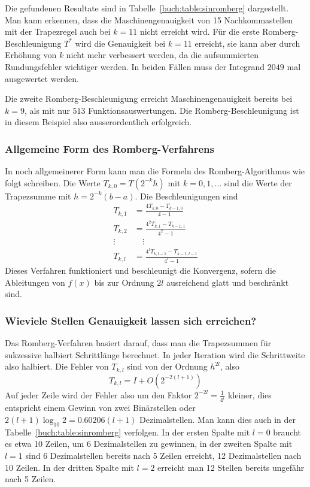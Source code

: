Die gefundenen Resultate sind in Tabelle~\ref{buch:table:sinromberg}
dargestellt.
Man kann erkennen, dass die Maschinengenauigkeit von 15 Nachkommastellen
mit der Trapezregel auch bei $k=11$  nicht erreicht wird.
Für die erste Romberg-Beschleunigung $T^*$ wird die Genauigkeit
bei $k=11$ erreicht, sie kann aber durch Erhöhung von $k$ nicht
mehr verbessert werden, da die aufsummierten Rundungsfehler
wichtiger werden.
In beiden Fällen muss der Integrand $2049$ mal ausgewertet werden.

Die zweite Romberg-Beschleunigung erreicht Maschinengenauigkeit bereits bei
$k=9$, als mit nur $513$ Funktionsauswertungen.
Die Romberg-Beschleunigung ist in diesem Beispiel also ausserordentlich
erfolgreich.

\subsubsection{Allgemeine Form des Romberg-Verfahrens}
In noch allgemeinerer Form kann man die Formeln des Romberg-Algorithmus
wie folgt schreiben.
Die Werte 
$T_{k,0} = T(2^{-k}h)$ mit $k=0,1,\dots$
sind die Werte der Trapezsumme mit $h=2^{-k}(b-a)$.
Die Beschleunigungen sind
\begin{align*}
T_{k,1} &= \frac{4T_{k,0}-T_{k-1,0}}{4-1} \\
T_{k,2} &= \frac{4^2T_{k,1}-T_{k-1,1}}{4^2-1}\\
\vdots\;&\quad \vdots\\
T_{k,l} &= \frac{4^lT_{k,l-1}-T_{k-1,l-1}}{4^l-1}
\end{align*}
Dieses Verfahren funktioniert und beschleunigt die Konvergenz,
sofern die Ableitungen von $f(x)$ bis zur Ordnung $2l$ ausreichend glatt
und beschränkt sind.

\subsubsection{Wieviele Stellen Genauigkeit lassen sich erreichen?}
Das Romberg-Verfahren basiert darauf, dass man die Trapezsummen 
für sukzessive halbiert Schrittlänge berechnet.
In jeder Iteration wird die Schrittweite also halbiert.
Die Fehler von $T_{k,l}$ sind von der Ordnung $h^{2l}$, also
\[
T_{k,l} = I + O(2^{-2(l+1)})
\]
Auf jeder Zeile wird der Fehler also um den Faktor
$2^{-2l}=\frac1{4^l}$ kleiner,
dies entspricht einem Gewinn von zwei Binärstellen oder 
$2(l+1)\log_{10}2=0.60206(l+1)$ Dezimalstellen.
Man kann dies auch in der Tabelle~\ref{buch:table:sinromberg}
verfolgen.
In der ersten Spalte mit $l=0$ braucht es etwa 10 Zeilen, um 6 Dezimalstellen
zu gewinnen, in der zweiten Spalte mit $l=1$ sind 6 Dezimalstellen
bereits nach 5 Zeilen erreicht, 12 Dezimalstellen nach 10 Zeilen.
In der dritten Spalte mit $l=2$ erreicht man 12 Stellen bereits ungefähr
nach 5 Zeilen.



